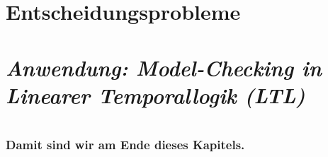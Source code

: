   \section[Entscheidungsprobl.]{Entscheidungsprobleme}
  

  \section[\protect\emph{Model-Checking}]{\protect\emph{Anwendung: Model-Checking in Linearer Temporallogik (LTL)}}
  

    

  \AtBeginSection{\relax}
  \section*{}

    \begin{frame}
      \frametitle{Damit sind wir am Ende dieses Kapitels.}
      \note{~}
    \end{frame}

